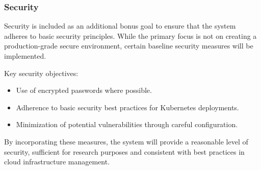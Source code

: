 \subsubsection{Security}

Security is included as an additional bonus goal to ensure that the system adheres to basic security principles. While the primary focus is not on creating a production-grade secure environment, certain baseline security measures will be implemented.

Key security objectives:
\begin{itemize}
\item Use of encrypted passwords where possible.
\item Adherence to basic security best practices for Kubernetes deployments.
\item Minimization of potential vulnerabilities through careful configuration.
\end{itemize}
By incorporating these measures, the system will provide a reasonable level of security, sufficient for research purposes and consistent with best practices in cloud infrastructure management.

